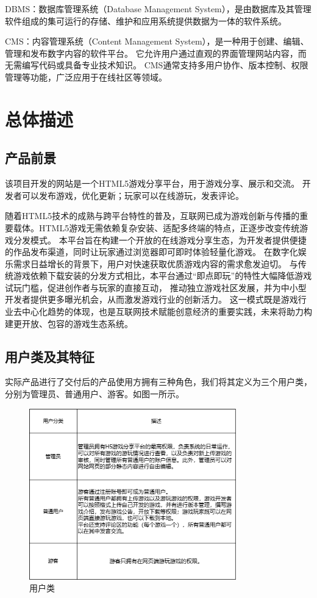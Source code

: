 \documentclass[12pt]{ctexart} %
\begin{document}
DBMS：数据库管理系统（Database Management System），是由数据库及其管理软件组成的集可运行的存储、维护和应用系统提供数据为一体的软件系统。

CMS：内容管理系统（Content Management System），是一种用于创建、编辑、管理和发布数字内容的软件平台。
它允许用户通过直观的界面管理网站内容，而无需编写代码或具备专业技术知识。
CMS通常支持多用户协作、版本控制、权限管理等功能，广泛应用于在线社区等领域。

\section{总体描述}
\subsection{产品前景}
该项目开发的网站是一个HTML5游戏分享平台，用于游戏分享、展示和交流。
开发者可以发布游戏，优化更新；玩家可以在线游玩，发表评论。

随着HTML5技术的成熟与跨平台特性的普及，互联网已成为游戏创新与传播的重要载体。HTML5游戏无需依赖复杂安装、适配多终端的特点，正逐步改变传统游戏分发模式。
本平台旨在构建一个开放的在线游戏分享生态，为开发者提供便捷的作品发布渠道，同时让玩家通过浏览器即可即时体验轻量化游戏。
在数字化娱乐需求日益增长的背景下，用户对快速获取优质游戏内容的需求愈发迫切。
与传统游戏依赖下载安装的分发方式相比，本平台通过“即点即玩”的特性大幅降低游戏试玩门槛，促进创作者与玩家的直接互动，
推动独立游戏社区发展，并为中小型开发者提供更多曝光机会，从而激发游戏行业的创新活力。
这一模式既是游戏行业去中心化趋势的体现，也是互联网技术赋能创意经济的重要实践，未来将助力构建更开放、包容的游戏生态系统。

\subsection{用户类及其特征}
实际产品进行了交付后的产品使用方拥有三种角色，我们将其定义为三个用户类，分别为管理员、普通用户、游客。如图一所示。

\begin{figure}[htbp]
  \centering
  \includegraphics[width=0.8\textwidth]{user_class.png}
  \caption{用户类}
  \label{f1}
\end{figure}
\end{document}
